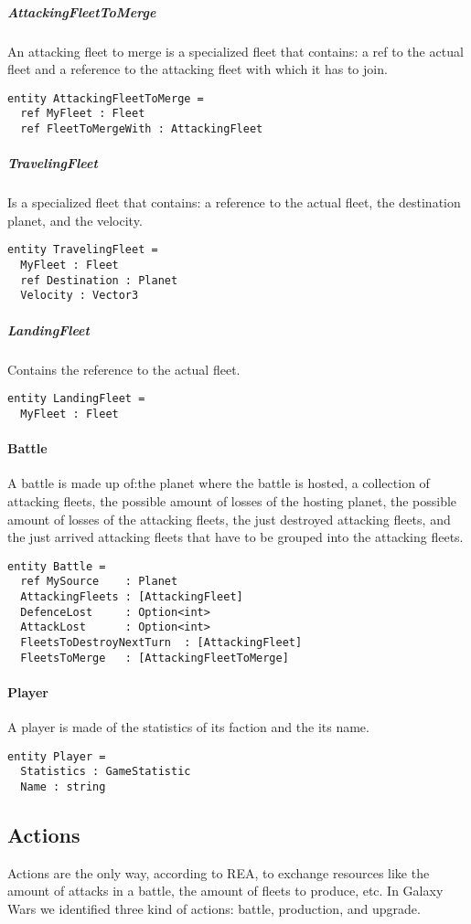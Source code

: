 \subparagraph{AttackingFleetToMerge}
An attacking fleet to merge is a specialized fleet that contains: a ref to the actual fleet and a reference to the attacking fleet with which it has to join.
\begin{lstlisting}
entity AttackingFleetToMerge =
  ref MyFleet : Fleet
  ref FleetToMergeWith : AttackingFleet
\end{lstlisting}

\subparagraph{TravelingFleet}
Is a specialized fleet that contains: a reference to the actual fleet, the destination planet, and the velocity.
\begin{lstlisting}
entity TravelingFleet =
  MyFleet : Fleet
  ref Destination : Planet
  Velocity : Vector3
\end{lstlisting}

\subparagraph{LandingFleet}
Contains the reference to the actual fleet.
\begin{lstlisting}
entity LandingFleet =
  MyFleet : Fleet
\end{lstlisting}

\paragraph{Battle}
A battle is made up of:the planet where the battle is hosted, a collection of attacking fleets, the possible amount of losses of the hosting planet, the possible amount of losses of the attacking fleets, the just destroyed attacking fleets, and the just arrived attacking fleets that have to be grouped into the attacking fleets.


\begin{lstlisting}
entity Battle =
  ref MySource    : Planet
  AttackingFleets : [AttackingFleet]
  DefenceLost     : Option<int>
  AttackLost      : Option<int>
  FleetsToDestroyNextTurn  : [AttackingFleet]
  FleetsToMerge   : [AttackingFleetToMerge]
\end{lstlisting}

\paragraph{Player}
A player is made of the statistics of its faction and the its name.
\begin{lstlisting}
entity Player =
  Statistics : GameStatistic
  Name : string
\end{lstlisting}

\subsection{Actions}
Actions are the only way, according to REA, to exchange resources like the amount of attacks in a battle, the amount of fleets to produce, etc. In Galaxy Wars we identified three kind of actions: battle, production, and upgrade.
\\\\
\noindent

